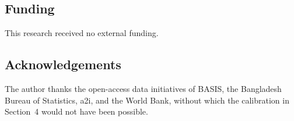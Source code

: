 \documentclass[11pt,a4paper]{article}
\begin{document}
\subsection*{Funding}
This research received no external funding.

\subsection*{Acknowledgements}
The author thanks the open-access data initiatives of BASIS, the
Bangladesh Bureau of Statistics, a2i, and the World Bank, without
which the calibration in Section~4 would not have been possible.

\renewcommand{\refname}{References}


\end{document}
